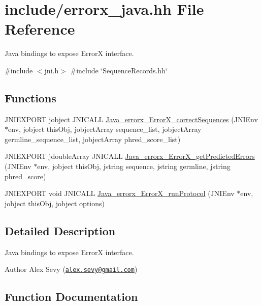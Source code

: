 \hypertarget{errorx__java_8hh}{}\section{include/errorx\+\_\+java.hh File Reference}
\label{errorx__java_8hh}


Java bindings to expose ErrorX interface.  


{\ttfamily \#include $<$jni.\+h$>$}\newline
{\ttfamily \#include \char`\"{}Sequence\+Records.\+hh\char`\"{}}\newline
\subsection*{Functions}
\begin{DoxyCompactItemize}
\item 
J\+N\+I\+E\+X\+P\+O\+RT jobject J\+N\+I\+C\+A\+LL \mbox{\hyperlink{errorx__java_8hh_ae41c0553425022325f0e98875533627f}{Java\+\_\+errorx\+\_\+\+Error\+X\+\_\+correct\+Sequences}} (J\+N\+I\+Env $\ast$env, jobject this\+Obj, jobject\+Array sequence\+\_\+list, jobject\+Array germline\+\_\+sequence\+\_\+list, jobject\+Array phred\+\_\+score\+\_\+list)
\item 
J\+N\+I\+E\+X\+P\+O\+RT jdouble\+Array J\+N\+I\+C\+A\+LL \mbox{\hyperlink{errorx__java_8hh_a9d9ca626bacf9b40bb6ffa89552bdd9f}{Java\+\_\+errorx\+\_\+\+Error\+X\+\_\+get\+Predicted\+Errors}} (J\+N\+I\+Env $\ast$env, jobject this\+Obj, jstring sequence, jstring germline, jstring phred\+\_\+score)
\item 
J\+N\+I\+E\+X\+P\+O\+RT void J\+N\+I\+C\+A\+LL \mbox{\hyperlink{errorx__java_8hh_a81324030f63574c572bea57ad469f75a}{Java\+\_\+errorx\+\_\+\+Error\+X\+\_\+run\+Protocol}} (J\+N\+I\+Env $\ast$env, jobject this\+Obj, jobject options)
\end{DoxyCompactItemize}


\subsection{Detailed Description}
Java bindings to expose ErrorX interface. 

\begin{DoxyAuthor}{Author}
Alex Sevy (\href{mailto:alex.sevy@gmail.com}{\tt alex.\+sevy@gmail.\+com}) 
\end{DoxyAuthor}


\subsection{Function Documentation}
\mbox{\label{errorx__java_8hh_ae41c0553425022325f0e98875533627f}} 
